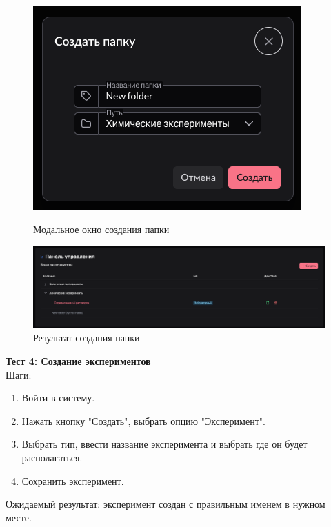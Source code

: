 \documentclass[a4paper,12pt,reqno]{article}
\begin{document}
    \begin{figure}[H]
        \centering
        \includegraphics[width=0.5\linewidth]{img/create_folder_modal.png}
        \caption{Модальное окно создания папки}
        \includegraphics[width=\linewidth]{img/create_folder_result.png}
        \caption{Результат создания папки}
    \end{figure}
    \vspace{0.5cm}
    
    \textbf{Тест 4: Создание экспериментов}\\
    Шаги:
    \begin{enumerate}
        \item Войти в систему.
        \item Нажать кнопку "Создать", выбрать опцию "Эксперимент".
        \item Выбрать тип, ввести название эксперимента и выбрать где он будет располагаться.
        \item Сохранить эксперимент.
    \end{enumerate}
    Ожидаемый результат: эксперимент создан с правильным именем в нужном месте.
\end{document}
